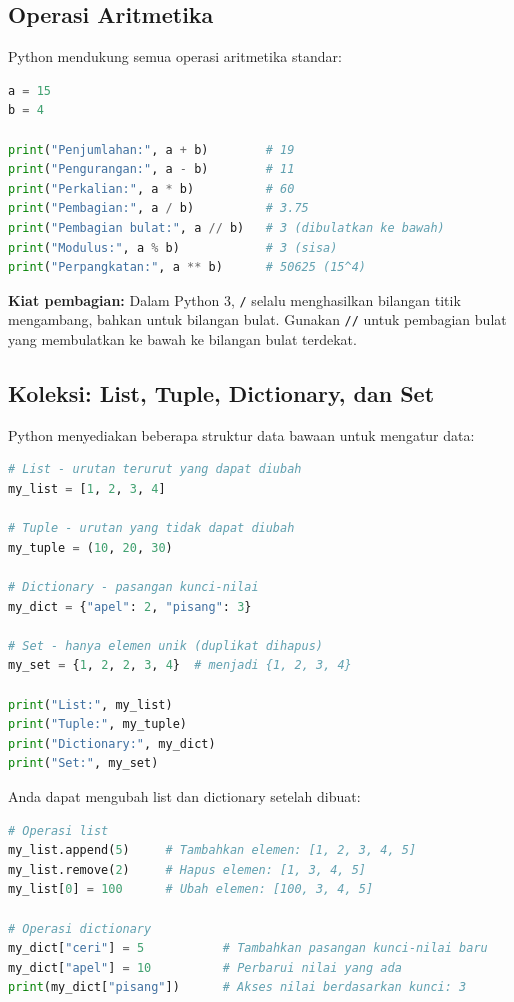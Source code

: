 \subsection{Operasi Aritmetika}

Python mendukung semua operasi aritmetika standar:

\begin{lstlisting}[language=Python]
a = 15
b = 4

print("Penjumlahan:", a + b)        # 19
print("Pengurangan:", a - b)        # 11
print("Perkalian:", a * b)          # 60
print("Pembagian:", a / b)          # 3.75
print("Pembagian bulat:", a // b)   # 3 (dibulatkan ke bawah)
print("Modulus:", a % b)            # 3 (sisa)
print("Perpangkatan:", a ** b)      # 50625 (15^4)
\end{lstlisting}

\begin{info}
\textbf{Kiat pembagian:} Dalam Python 3, \texttt{/} selalu menghasilkan bilangan titik mengambang, bahkan untuk bilangan bulat. Gunakan \texttt{//} untuk pembagian bulat yang membulatkan ke bawah ke bilangan bulat terdekat.
\end{info}

\subsection{Koleksi: List, Tuple, Dictionary, dan Set}

Python menyediakan beberapa struktur data bawaan untuk mengatur data:

\begin{lstlisting}[language=Python]
# List - urutan terurut yang dapat diubah
my_list = [1, 2, 3, 4]

# Tuple - urutan yang tidak dapat diubah
my_tuple = (10, 20, 30)

# Dictionary - pasangan kunci-nilai
my_dict = {"apel": 2, "pisang": 3}

# Set - hanya elemen unik (duplikat dihapus)
my_set = {1, 2, 2, 3, 4}  # menjadi {1, 2, 3, 4}

print("List:", my_list)
print("Tuple:", my_tuple)
print("Dictionary:", my_dict)
print("Set:", my_set)
\end{lstlisting}

Anda dapat mengubah list dan dictionary setelah dibuat:

\begin{lstlisting}[language=Python]
# Operasi list
my_list.append(5)     # Tambahkan elemen: [1, 2, 3, 4, 5]
my_list.remove(2)     # Hapus elemen: [1, 3, 4, 5]
my_list[0] = 100      # Ubah elemen: [100, 3, 4, 5]

# Operasi dictionary
my_dict["ceri"] = 5           # Tambahkan pasangan kunci-nilai baru
my_dict["apel"] = 10          # Perbarui nilai yang ada
print(my_dict["pisang"])      # Akses nilai berdasarkan kunci: 3
\end{lstlisting}

